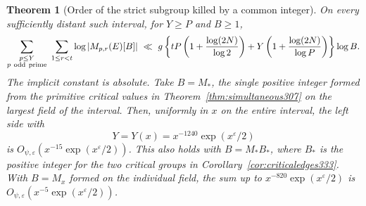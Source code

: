 \documentclass[a4paper,11pt]{article}
\newtheorem{theorem}[proposition]{Theorem}
\theoremstyle{definition}
\theoremstyle{remark}
\numberwithin{equation}{section}
\begin{document}
\begin{theorem}[Order of the strict subgroup killed by a common integer]
\label{thm:integerlayers333}
On every sufficiently distant such interval, for \(Y\ge P\) and \(B\ge1\),
\[
 \begin{split}
 \sum_{\substack{p\le Y\\p\ {\rm odd\ prime}}}\ \sum_{1\le r<t}
        \log|M_{p,r}(E)[B]|
 \ \ll\ 
 g\left\{tP\left(1+\frac{\log(2N)}{\log 2}\right)
        +Y\left(1+\frac{\log(2N)}{\log P}\right)\right\}\log B .
 \end{split}
\]
The implicit constant is absolute. Take \(B=M_*\), the single positive
integer formed from the primitive critical values in
Theorem~\ref{thm:simultaneous307} on the largest field of the interval.
Then, uniformly in \(x\) on the entire interval, the left side with
\[
             Y=Y(x)=x^{-1240}\exp(x^\varepsilon/2)
\]
is \(O_{\psi,\varepsilon}(x^{-15}\exp(x^\varepsilon/2))\).
This also holds with \(B=M_*B_*\), where \(B_*\) is the positive
integer for the two critical groups in Corollary~\ref{cor:criticaledges333}.
With \(B=M_x\) formed on the individual field, the sum up to
\(x^{-820}\exp(x^\varepsilon/2)\) is
\(O_{\psi,\varepsilon}(x^{-5}\exp(x^\varepsilon/2))\).
\end{theorem}
\end{document}
